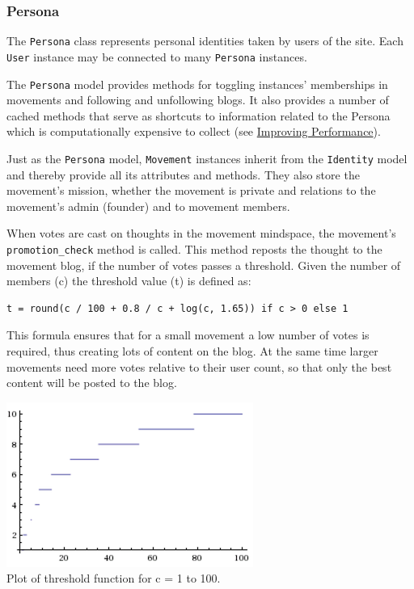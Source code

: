\subsubsection{Persona}\label{persona}

The \texttt{Persona} class represents personal identities taken by users
of the site. Each \texttt{User} instance may be connected to many
\texttt{Persona} instances.

The \texttt{Persona} model provides methods for toggling instances'
memberships in movements and following and unfollowing blogs. It also
provides a number of cached methods that serve as shortcuts to
information related to the Persona which is computationally expensive to
collect (see \hyperref[improving-performance]{Improving Performance}).


Just as the \texttt{Persona} model, \texttt{Movement} instances inherit
from the \texttt{Identity} model and thereby provide all its attributes
and methods. They also store the movement's mission, whether the
movement is private and relations to the movement's admin (founder) and
to movement members.

When votes are cast on thoughts in the movement mindspace, the
movement's \texttt{promotion\_check} method is called. This method
reposts the thought to the movement blog, if the number of votes passes
a threshold. Given the number of members (c) the threshold value (t) is
defined as:

\begin{verbatim}
t = round(c / 100 + 0.8 / c + log(c, 1.65)) if c > 0 else 1
\end{verbatim}

This formula ensures that for a small movement a low number of votes is
required, thus creating lots of content on the blog. At the same time
larger movements need more votes relative to their user count, so that
only the best content will be posted to the blog.

\includegraphics{img/threshold_1.png}\\
 Plot of threshold function for c = 1 to 100.

